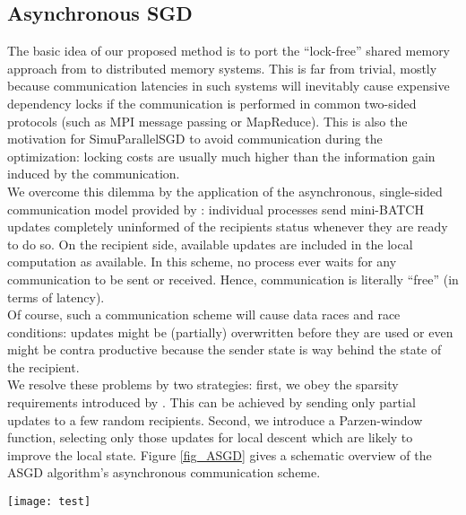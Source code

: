 \documentclass{acm_proc_article-sp}
\begin{document}
\subsection{Asynchronous SGD}\label{sec_ASGD_concept}
The basic idea of our proposed method is to port the ``lock-free'' shared memory approach from 
\cite{recht2011hogwild} to distributed memory systems. This is far from trivial,
mostly because communication latencies in such systems will inevitably cause 
expensive dependency locks if the communication is performed in common two-sided
protocols (such as MPI message passing or MapReduce). This is also the
motivation for SimuParallelSGD \cite{SGDsmola} to avoid communication
 during the optimization: locking costs are usually much higher than the information
gain induced by the communication.\\
We overcome this dilemma by the application of the asynchronous, single-sided 
communication model provided by \cite{grunewald2013gaspi}: individual processes
send mini-BATCH \cite{sculley2010web} updates completely uninformed 
of the recipients status whenever they are ready to do so. On the recipient 
side, available updates are included in the local computation as available. 
In this scheme, no process ever waits for any communication to be sent or 
received. Hence, communication is literally ``free'' (in terms of latency).\\
Of course, such a communication scheme will cause data races and race conditions: 
updates might  be (partially) overwritten before they are used or even might be 
contra productive because the sender state is way behind the state of the recipient.\\
We resolve these problems by two strategies: first, we obey 
the sparsity requirements introduced by \cite{recht2011hogwild}.
This can be 
achieved by sending only partial updates to a few random recipients. Second,
we introduce a Parzen-window function, selecting only those updates
for local descent which are likely to improve the local state.          
Figure \ref{fig_ASGD} gives a schematic overview of the ASGD algorithm's 
asynchronous communication scheme.
\begin{figure*}
\centering
\texttt{[image: test]}
\caption{Overview of the asynchronous update communication used in ASGD.
Given a cluster environment of  nodes with  threads each, the blue markers 
indicate different stages and scenarios of the communication mode. {\bf I:} Thread 
 of node  finished the computation of of its local  mini-batch update. 
The external buffer is empty. Hence it executes the update locally and sends
the resulting state to a few random recipients.
{\bf II:} Thread  of node  receives an update. When its local mini-batch update
is ready, it will use the external buffer to correct its local update and then
follow I.
{\bf III:} Shows a potential data race: two external updates might overlap
in the external buffer of thread  of node . Resolving
data races is discussed in section \ref{sec_race}.
\label{fig_ASGD}
} 
\end{figure*}
\end{document}
